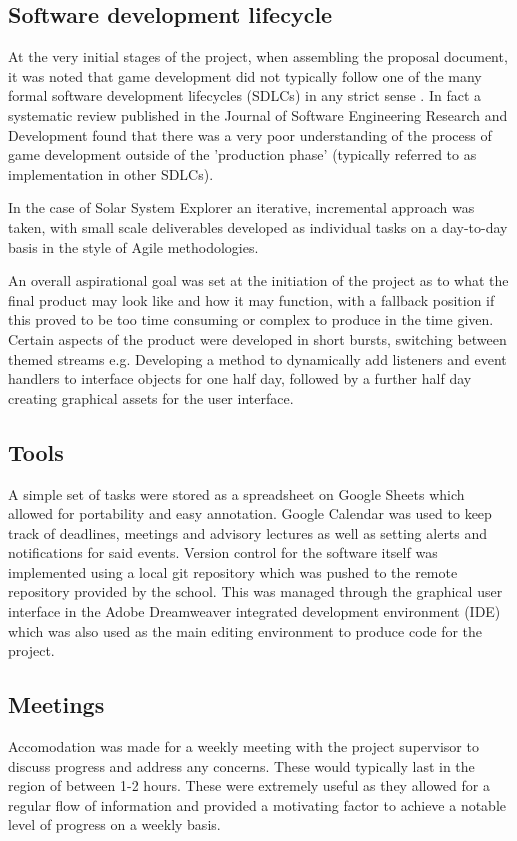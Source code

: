 \documentclass[twoside]{bhamthesis}
\begin{document}
\subsection{Software development lifecycle}
At the very initial stages of the project, when assembling the proposal document, it was noted that game development did not typically follow one of the many formal software development lifecycles (SDLCs) in any strict sense \cite{ramadan_game_2013}. In fact a systematic review published in the Journal of Software Engineering Research and Development found that there was a very poor understanding of the process of game development outside of the 'production phase' (typically referred to as implementation in other SDLCs).

In the case of Solar System Explorer an iterative, incremental approach was taken, with small scale deliverables developed as individual tasks on a day-to-day basis in the style of Agile methodologies.

An overall aspirational goal was set at the initiation of the project as to what the final product may look like and how it may function, with a fallback position if this proved to be too time consuming or complex to produce in the time given. Certain aspects of the product were developed in short bursts, switching between themed streams e.g. Developing a method to dynamically add listeners and event handlers to interface objects for one half day, followed by a further half day creating graphical assets for the user interface.


\subsection{Tools}
A simple set of tasks were stored as a spreadsheet on Google Sheets which allowed for portability and easy annotation. Google Calendar was used to keep track of deadlines, meetings and advisory lectures as well as setting alerts and notifications for said events. Version control for the software itself was implemented using a local git repository which was pushed to the remote repository provided by the school. This was managed through the graphical user interface in the Adobe Dreamweaver integrated development environment (IDE) which was also used as the main editing environment to produce code for the project.

\subsection{Meetings}
Accomodation was made for a weekly meeting with the project supervisor to discuss progress and address any concerns. These would typically last in the region of between 1-2 
hours. These were extremely useful as they allowed for a regular flow of information and provided a motivating factor to achieve a notable level of progress on a weekly basis.
\end{document}
